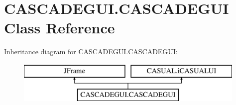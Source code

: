 \hypertarget{class_c_a_s_c_a_d_e_g_u_i_1_1_c_a_s_c_a_d_e_g_u_i}{\section{C\-A\-S\-C\-A\-D\-E\-G\-U\-I.\-C\-A\-S\-C\-A\-D\-E\-G\-U\-I Class Reference}
\label{class_c_a_s_c_a_d_e_g_u_i_1_1_c_a_s_c_a_d_e_g_u_i}
}
Inheritance diagram for C\-A\-S\-C\-A\-D\-E\-G\-U\-I.\-C\-A\-S\-C\-A\-D\-E\-G\-U\-I\-:\begin{figure}[H]
\begin{center}
\leavevmode
\includegraphics[height=2.000000cm]{class_c_a_s_c_a_d_e_g_u_i_1_1_c_a_s_c_a_d_e_g_u_i}
\end{center}
\end{figure}
